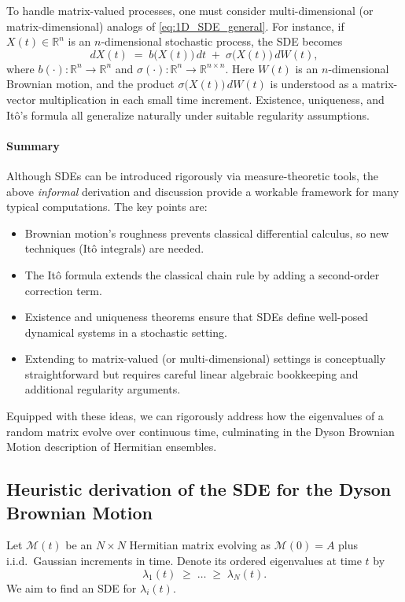 \documentclass[letterpaper,11pt,oneside,reqno]{article}
\numberwithin{equation}{section}
\theoremstyle{definition}
\begin{document}
\medskip
To handle matrix-valued processes, one must consider multi-dimensional (or matrix-dimensional) analogs of \eqref{eq:1D_SDE_general}. For instance, if \(X(t)\in\mathbb{R}^n\) is an \(n\)-dimensional stochastic process, the SDE becomes
\[
dX(t)
\;=\;
b\bigl(X(t)\bigr)\,dt
\;+\;
\sigma\bigl(X(t)\bigr)\,dW(t),
\]
where \(b(\cdot)\colon\mathbb{R}^n\to\mathbb{R}^n\) and \(\sigma(\cdot)\colon\mathbb{R}^n\to \mathbb{R}^{n\times n}\). Here \(W(t)\) is an \(n\)-dimensional Brownian motion, and the product \(\sigma\bigl(X(t)\bigr)\,dW(t)\) is understood as a matrix-vector multiplication in each small time increment. Existence, uniqueness, and Itô’s formula all generalize naturally under suitable regularity assumptions.

\paragraph{Summary}
Although SDEs can be introduced rigorously via measure-theoretic tools, the above \emph{informal} derivation and discussion provide a workable framework for many typical computations. The key points are:
\begin{itemize}
\item Brownian motion’s roughness prevents classical differential calculus, so new techniques (Itô integrals) are needed.
\item The Itô formula extends the classical chain rule by adding a second-order correction term.
\item Existence and uniqueness theorems ensure that SDEs define well-posed dynamical systems in a stochastic setting.
\item Extending to matrix-valued (or multi-dimensional) settings is conceptually straightforward but requires careful linear algebraic bookkeeping and additional regularity arguments.
\end{itemize}
Equipped with these ideas, we can rigorously address how the eigenvalues of a random matrix evolve over continuous time, culminating in the Dyson Brownian Motion description of Hermitian ensembles.

\subsection{Heuristic derivation of the SDE for the Dyson Brownian Motion}


Let $\mathcal{M}(t)$ be an $N\times N$ Hermitian matrix evolving as $\mathcal{M}(0)=A$ plus i.i.d.\ Gaussian increments in time. Denote its ordered eigenvalues at time $t$ by
\[
\lambda_1(t)\;\ge\;\dots\;\ge\;\lambda_N(t).
\]
We aim to find an SDE for $\lambda_i(t)$.
\end{document}
